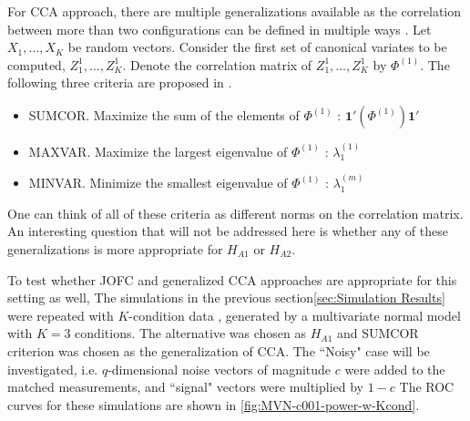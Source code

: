 \documentclass[11pt]{article} %
\begin{document}
For CCA approach, there are multiple generalizations available as the correlation between more than two configurations can be defined in multiple ways \cite{generalCCA}. Let $X_1,\ldots,X_K$ be random vectors. Consider the first set of canonical variates to be computed, $Z_1^{1},\ldots,Z_K^{1}$. Denote  the correlation matrix of  $Z_1^{1},\ldots,Z_K^{1}$ by $\Phi^{(1)}$.   The following three criteria  are proposed in \cite{generalCCA}.
\begin{itemize}
\item SUMCOR. Maximize the sum of the elements of $\Phi^{(1)}$ : $\mathbf{1'}(\Phi^{(1)})\mathbf{1'}$
\item MAXVAR. Maximize the largest eigenvalue of $\Phi^{(1)}$ : $\lambda^{(1)}_1$ 
\item  MINVAR. Minimize  the smallest eigenvalue of $\Phi^{(1)}$ : $\lambda^{(m)}_1$ 
\end{itemize}
One can think of all of these criteria as different norms on the correlation matrix.
An interesting question that will not be addressed here is whether any of these generalizations is more appropriate for $H_{A1}$ or $H_{A2}$.

To test whether JOFC and generalized CCA approaches are appropriate for this setting as well,
The simulations in the previous section\ref{sec:Simulation Results} were repeated with $K$-condition data , generated by a multivariate normal model with $K=3$ conditions. 
The alternative was chosen as $ H_{A1}$ and SUMCOR criterion was chosen as the generalization of CCA.
 The ``Noisy" case will be investigated, i.e. 
 $q$-dimensional noise vectors of magnitude $c$ were added to the matched measurements, and ``signal" vectors were multiplied by $1-c$  
 The ROC curves for these simulations are shown in \ref{fig:MVN-c001-power-w-Kcond}.
\end{document}

